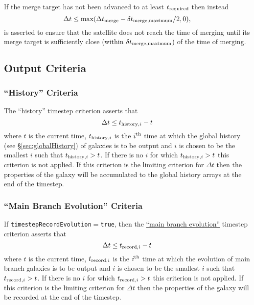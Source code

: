 If the merge target has not been advanced to at least $t_{\rm required}$ then instead
\begin{equation}
\Delta t \le \hbox{max}(\Delta t_{\rm merge}-\delta t_{\rm merge,maximum}/2,0),
\end{equation}
is asserted to ensure that the satellite does not reach the time of merging until its merge target is sufficiently close (within $\delta t_{\rm merge,maximum}$) of the time of merging.

\subsection{Output Criteria}

\subsubsection{``History'' Criteria}

The \hyperlink{merger_trees.evolve.timesteps.history.F90:merger_tree_timesteps_history:merger_tree_timestep_history}{``history''} timestep criterion asserts that
\begin{equation}
 \Delta t \le t_{{\rm history},i} - t
\end{equation}
where $t$ is the current time, $t_{{\rm history},i}$ is the $i^{\rm th}$ time at which the global history (see \S\ref{sec:globalHistory}) of galaxies is to be output and $i$ is chosen to be the smallest $i$ such that $t_{{\rm history},i} > t$. If there is no $i$ for which $t_{{\rm history},i} > t$ this criterion is not applied. If this criterion is the limiting criterion for $\Delta t$ then the properties of the galaxy will be accumulated to the global history arrays at the end of the timestep.

\subsubsection{``Main Branch Evolution'' Criteria}

If {\tt timestepRecordEvolution}$=${\tt true}, then the \hyperlink{merger_trees.evolve.timesteps.record_evolution.F90:merger_tree_timesteps_record_evolution:merger_tree_timestep_record_evolution}{``main branch evolution''} timestep criterion asserts that
\begin{equation}
 \Delta t \le t_{{\rm record},i} - t
\end{equation}
where $t$ is the current time, $t_{{\rm record},i}$ is the $i^{\rm th}$ time at which the evolution of main branch galaxies is to be output and $i$ is chosen to be the smallest $i$ such that $t_{{\rm record},i} > t$. If there is no $i$ for which $t_{{\rm record},i} > t$ this criterion is not applied. If this criterion is the limiting criterion for $\Delta t$ then the properties of the galaxy will be recorded at the end of the timestep.

